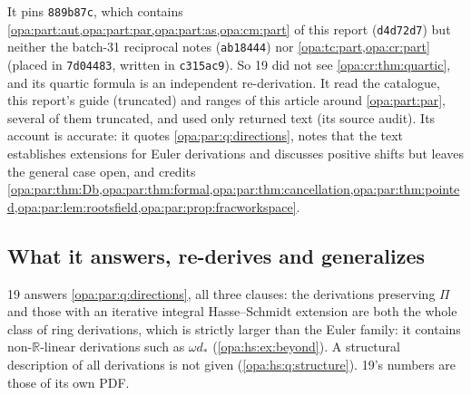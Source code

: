 \documentclass[11pt,oneside]{article}
\numberwithin{equation}{section}
\theoremstyle{definition}
\theoremstyle{remark}
\newcommand{\R}{\mathbb R}
\begin{document}
It pins \texttt{889b87c}, which contains \cref{opa:part:aut,opa:part:par,opa:part:as,opa:cm:part} of this report (\texttt{d4d72d7}) but
neither the batch-31 reciprocal notes (\texttt{ab18444}) nor \cref{opa:tc:part,opa:cr:part} (placed in \texttt{7d04483}, written in
\texttt{c315ac9}). So 19 did not see \cref{opa:cr:thm:quartic}, and its quartic formula is an independent re-derivation. It read the
catalogue, this report's guide (truncated) and ranges of this article around \cref{opa:part:par}, several of them truncated, and used
only returned text (its source audit). Its account is accurate: it quotes \cref{opa:par:q:directions}, notes that the text establishes
extensions for Euler derivations and discusses positive shifts but leaves the general case open, and credits
\cref{opa:par:thm:Db,opa:par:thm:formal,opa:par:thm:cancellation,opa:par:thm:pointed,opa:par:lem:rootsfield,opa:par:prop:fracworkspace}.

\subsection{What it answers, re-derives and generalizes}\label{opa:hs:sub:once}

19 answers \cref{opa:par:q:directions}, all three clauses: the derivations preserving $\Pi$ and those with an iterative integral
Hasse--Schmidt extension are both the whole class of ring derivations, which is strictly larger than the Euler family: it contains
non-$\R$-linear derivations such as $\omega d_*$ (\cref{opa:hs:ex:beyond}). A structural description of all derivations is not given
(\cref{opa:hs:q:structure}). 19's numbers are those of its own PDF.
\end{document}
